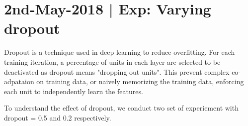 \documentclass[runningheads]{llncs}
\begin{document}
\section{2nd-May-2018 | Exp: Varying dropout}

Dropout is a technique used in deep learning to reduce overfitting. For each training iteration, a percentage of units in each layer are selected to be deactivated as dropout means "dropping out units". This prevent complex co-adpataion on training data, or naively memorizing the training data, enforcing each unit to independently learn the features.

To understand the effect of dropout, we conduct two set of experiement with dropout = 0.5 and 0.2 respectively. 







\clearpage



\end{document}
